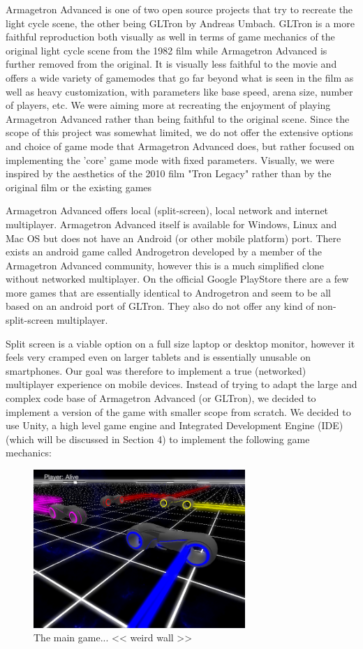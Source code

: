 \documentclass{report}
\begin{document}
Armagetron Advanced\cite{AA} is one of two open source projects that try to recreate the light cycle scene, the other being GLTron\cite{GLT} by Andreas Umbach\cite{Umbach}.
GLTron is a more faithful reproduction both visually as well in terms of game mechanics of the original light cycle scene from the 1982 film while Armagetron Advanced is further removed from the original. It is visually less faithful to the movie and offers a wide variety of gamemodes that go far beyond what is seen in the film as well as heavy customization, with parameters like base speed, arena size, number of players, etc.
We were aiming more at recreating the enjoyment of playing Armagetron Advanced rather than being faithful to the original scene.
Since the scope of this project was somewhat limited, we do not offer the extensive options and choice of game mode that Armagetron Advanced does, 
but rather focused on implementing the 'core' game mode with fixed parameters. Visually, we were inspired by the aesthetics of the 2010 film "Tron Legacy" rather than by the original film or the existing games

Armagetron Advanced offers local (split-screen), local network and internet multiplayer.
Armagetron Advanced itself is available for Windows, Linux and Mac OS but does not have an Android (or other mobile platform) port.
 There exists an android game called Androgetron\cite{Andro} developed by a member of the Armagetron Advanced community, however this is a much simplified clone without networked multiplayer.
  On the official Google Play\texttrademark Store there are a few more games\cite{GP1}\cite{GP2}\cite{GP3} that are essentially identical to Androgetron and seem to be all based on an android port of GLTron. They also do not offer any kind of non-split-screen multiplayer.

Split screen is a viable option on a full size laptop or desktop monitor, however it feels very cramped even on larger tablets and is essentially unusable on smartphones.
Our goal was therefore to implement a true (networked) multiplayer experience on mobile devices.
Instead of trying to adapt the large and complex code base of Armagetron Advanced (or GLTron), we decided to implement a version of the game with smaller scope from scratch.
We decided to use Unity, a high level game engine and Integrated Development Engine (IDE) (which will be discussed in Section 4) to implement the following game mechanics:

\begin{figure}
 	 	    \includegraphics[height=6cm]{tron_four}
 	  
 	 	\caption{The main game... << weird wall >> }
 \end{figure}
 
\end{document}
